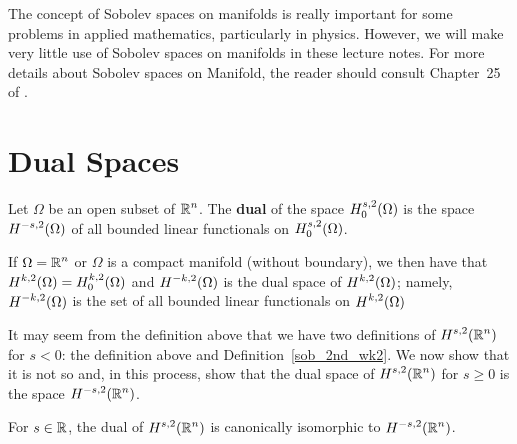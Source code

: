 The concept of Sobolev spaces on manifolds is really important for
some problems in applied mathematics, particularly in physics.
However, we will make very little use of Sobolev spaces on manifolds
in these lecture notes.  For more details about Sobolev spaces on
Manifold, the reader should consult Chapter~25 of \cite{Tr}.

\section{Dual Spaces} \label{sobDualSp}

\begin{defn}
Let $\Omega$ be an open subset of $\displaystyle \mathbb{R}^n$.  The
{\bfseries dual} of the space
$\displaystyle H^{s,2}_0(\Omega)$ is the space
$\displaystyle H^{-s,2}(\Omega)$ of all bounded
linear functionals on $\displaystyle H^{s,2}_0(\Omega)$.
\end{defn}

\begin{rmk}
If $\displaystyle \Omega = \mathbb{R}^n$ or $\Omega$ is a compact manifold
(without boundary), we then have
that $\displaystyle H^{k,2}(\Omega) = H^{k,2}_0(\Omega)$ and
$\displaystyle H^{-k,2}(\Omega)$ is
the dual space of $\displaystyle H^{k,2}(\Omega)$; namely,
$\displaystyle H^{-k,2}(\Omega)$ is the
set of all bounded linear functionals on $\displaystyle H^{k,2}(\Omega)$
\end{rmk}

It may seem from the definition above that we have two definitions
of $\displaystyle H^{s,2}(\mathbb{R}^n)$ for $s < 0$: the definition above
and Definition~\ref{sob_2nd_wk2}.  We now show that it is not so and,
in this process, show that the dual space of $\displaystyle H^{s,2}(\mathbb{R}^n)$
for $s\geq 0$ is the space $\displaystyle H^{-s,2}(\mathbb{R}^n)$.

\begin{prop}
For $\displaystyle s \in \mathbb{R}$, the dual of
$\displaystyle H^{s,2}(\mathbb{R}^n)$ is canonically isomorphic 
to $\displaystyle H^{-s,2}(\mathbb{R}^n)$.
\end{prop}

